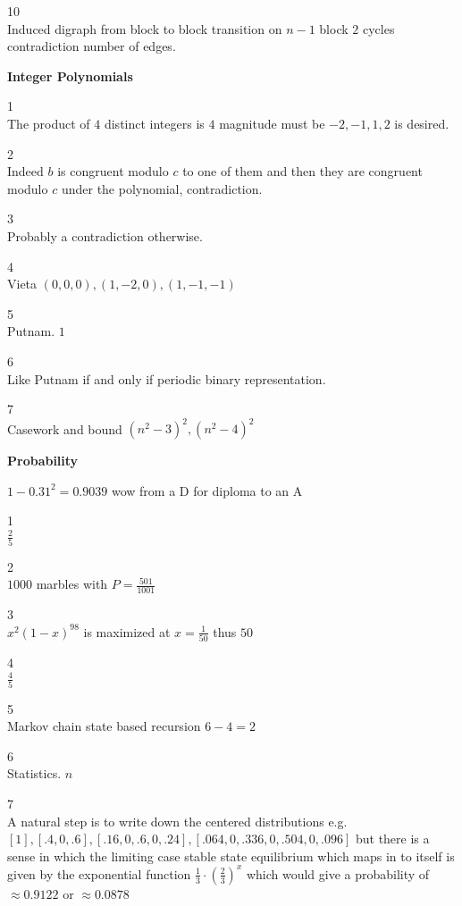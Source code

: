 10 \\
Induced digraph from block to block transition on $n-1$ block $2$ cycles contradiction number of edges.

\newpage

\textbf{Integer Polynomials}

1 \\
The product of $4$ distinct integers is $4$ magnitude must be $-2,-1,1,2$ is desired.

2 \\
Indeed $b$ is congruent modulo $c$ to one of them and then they are congruent modulo $c$ under the polynomial, contradiction.

3 \\
Probably a contradiction otherwise.

4 \\
Vieta $(0,0,0),(1,-2,0),(1,-1,-1)$

5 \\
Putnam. $\boxed{1}$

6 \\
Like Putnam if and only if periodic binary representation.

7 \\
Casework and bound $(n^2-3)^2,(n^2-4)^2$

\newpage

\textbf{Probability}

$1-0.31^2=0.9039$ wow from a D for diploma to an A

1 \\
$\boxed{\frac{2}{5}}$

2 \\
$1000$ marbles with $P=\frac{501}{1001}$

3 \\
$x^2(1-x)^{98}$ is maximized at $x=\frac{1}{50}$ thus $\boxed{50}$

4 \\
$\frac{4}{5}$

5 \\
Markov chain state based recursion $6-4=\boxed{2}$

6 \\
Statistics. $\boxed{n}$

7 \\
A natural step is to write down the centered distributions e.g. $[1],[.4,0,.6],[.16,0,.6,0,.24],[.064,0,.336,0,.504,0,.096]$ but there is a sense in which the limiting case stable state equilibrium which maps in to itself is given by the exponential function $\frac{1}{3} \cdot \left(\frac{2}{3} \right)^{x}$ which would give a probability of $\approx 0.9122$ or $\approx 0.0878$

